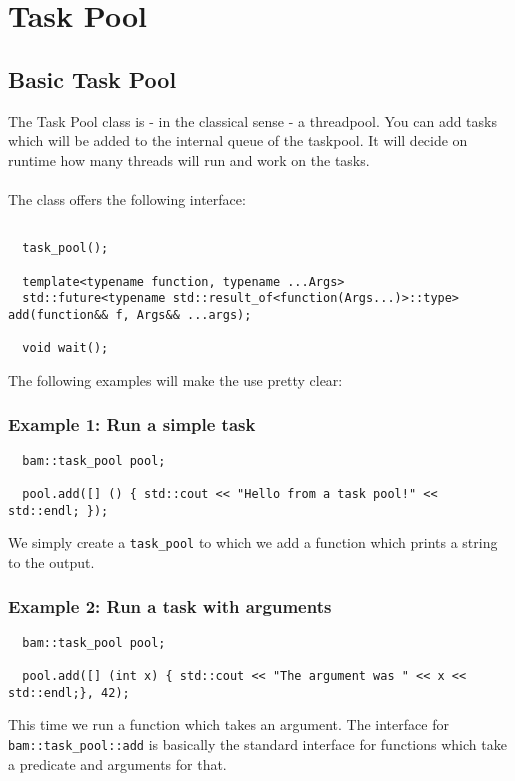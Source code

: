 \documentclass[11pt, a4paper]{article}
\begin{document}
\section{Task Pool}
\subsection{ Basic Task Pool}

The Task Pool class is - in the classical sense - a threadpool. You can add tasks which will be added to the internal queue of the taskpool. It will decide on runtime how many threads will run and work on the tasks. \\\\
The class offers the following interface:\\

\begin{lstlisting}

  task_pool();

  template<typename function, typename ...Args>
  std::future<typename std::result_of<function(Args...)>::type> add(function&& f, Args&& ...args);

  void wait();

\end{lstlisting}

The following examples will make the use pretty clear:

\subsubsection{Example 1: Run a simple task}

\begin{lstlisting}
  bam::task_pool pool;

  pool.add([] () { std::cout << "Hello from a task pool!" << std::endl; });

\end{lstlisting}

We simply create a \texttt{task\_pool} to which we add a function which prints a string to the output. 

\subsubsection{Example 2: Run a task with arguments}
\begin{lstlisting}
  bam::task_pool pool;

  pool.add([] (int x) { std::cout << "The argument was " << x << std::endl;}, 42);
\end{lstlisting}
This time we run a function which takes an argument. The interface for \texttt{bam::task\_pool::add} is basically the standard interface for functions which take a predicate and arguments for that. 
\end{document}
